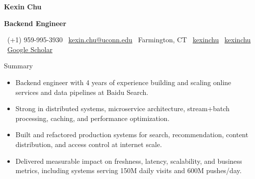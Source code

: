 \documentclass[]{resume}
\newcommand{\sectionvspace}{\vspace{1.5pt}}
\newcommand{\MakeHeader}[8]{%
\noindent
{\centering \bfseries \LARGE #1 \par}
\vspace{2pt}

\noindent
\colorbox{HeaderOrange}{%
  \parbox{\textwidth}{%
    \vspace{2pt}
    \centering
    {\color{white}\bfseries\normalsize #2}
    \vspace{2pt}
  }%
}\par

\noindent
\colorbox{HeaderLight}{%
  \parbox{\textwidth}{%
    \vspace{2pt}
    \small
    \faPhone\ #3 \hfill
    \faEnvelope\ \href{mailto:#4}{#4} \hfill
    \faMapMarker*\ #5 \hfill
    \faLinkedin\ \href{#6}{kexinchu} \hfill
    \faGithub\ \href{#7}{kexinchu} \hfill
    \faGraduationCap\ \href{#8}{Google Scholar}
    \vspace{2pt}
  }%
}\par
}
\begin{document}
\MakeHeader
{Kexin Chu}
{Backend Engineer}
{(+1) 959-995-3930}
{kexin.chu@uconn.edu}
{Farmington, CT}
{https://www.linkedin.com/in/kexin-chu-69a481192}
{https://kexinchu.github.io/}
{https://scholar.google.com/citations?user=ZIdS3d0AAAAJ}

\begin{rSection}{Summary}\sectionvspace
\begin{itemize}[leftmargin=1.2em, itemsep=0.15em, topsep=0.2em]
    \item Backend engineer with 4 years of experience building and scaling online services and data pipelines at Baidu Search.
    \item Strong in distributed systems, microservice architecture, stream+batch processing, caching, and performance optimization.
    \item Built and refactored production systems for search, recommendation, content distribution, and access control at internet scale.
    \item Delivered measurable impact on freshness, latency, scalability, and business metrics, including systems serving 150M daily visits and 600M pushes/day.
\end{itemize}
\end{rSection}
\end{document}
